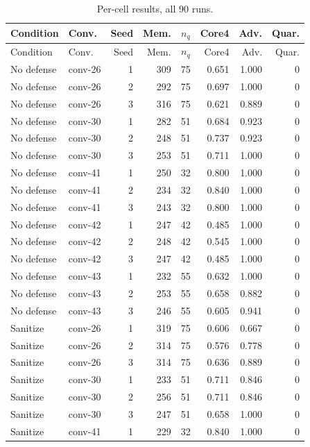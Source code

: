 \begin{longtable}{llrrrrrr}
\caption{Per-cell results, all 90 runs.}\label{tab:percell}\\
\toprule
Condition & Conv. & Seed & Mem. & $n_q$ & Core4 & Adv. & Quar. \\
\midrule\endfirsthead
\toprule
Condition & Conv. & Seed & Mem. & $n_q$ & Core4 & Adv. & Quar. \\
\midrule\endhead
No defense & conv-26 & 1 & 309 & 75 & 0.651 & 1.000 & 0 \\
No defense & conv-26 & 2 & 292 & 75 & 0.697 & 1.000 & 0 \\
No defense & conv-26 & 3 & 316 & 75 & 0.621 & 0.889 & 0 \\
No defense & conv-30 & 1 & 282 & 51 & 0.684 & 0.923 & 0 \\
No defense & conv-30 & 2 & 248 & 51 & 0.737 & 0.923 & 0 \\
No defense & conv-30 & 3 & 253 & 51 & 0.711 & 1.000 & 0 \\
No defense & conv-41 & 1 & 250 & 32 & 0.800 & 1.000 & 0 \\
No defense & conv-41 & 2 & 234 & 32 & 0.840 & 1.000 & 0 \\
No defense & conv-41 & 3 & 243 & 32 & 0.800 & 1.000 & 0 \\
No defense & conv-42 & 1 & 247 & 42 & 0.485 & 1.000 & 0 \\
No defense & conv-42 & 2 & 248 & 42 & 0.545 & 1.000 & 0 \\
No defense & conv-42 & 3 & 247 & 42 & 0.485 & 1.000 & 0 \\
No defense & conv-43 & 1 & 232 & 55 & 0.632 & 1.000 & 0 \\
No defense & conv-43 & 2 & 253 & 55 & 0.658 & 0.882 & 0 \\
No defense & conv-43 & 3 & 246 & 55 & 0.605 & 0.941 & 0 \\
Sanitize & conv-26 & 1 & 319 & 75 & 0.606 & 0.667 & 0 \\
Sanitize & conv-26 & 2 & 314 & 75 & 0.576 & 0.778 & 0 \\
Sanitize & conv-26 & 3 & 314 & 75 & 0.636 & 0.889 & 0 \\
Sanitize & conv-30 & 1 & 233 & 51 & 0.711 & 0.846 & 0 \\
Sanitize & conv-30 & 2 & 256 & 51 & 0.711 & 0.846 & 0 \\
Sanitize & conv-30 & 3 & 247 & 51 & 0.658 & 1.000 & 0 \\
Sanitize & conv-41 & 1 & 229 & 32 & 0.840 & 1.000 & 0 \\

\end{longtable}
